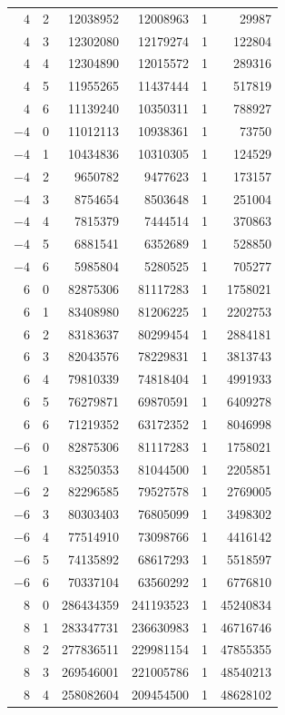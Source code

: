 {\begin{longtable}{rrrrrr}
$4$ & 2 & 12038952 & 12008963 & 1 & 29987\\
$4$ & 3 & 12302080 & 12179274 & 1 & 122804\\
$4$ & 4 & 12304890 & 12015572 & 1 & 289316\\
$4$ & 5 & 11955265 & 11437444 & 1 & 517819\\
$4$ & 6 & 11139240 & 10350311 & 1 & 788927\\
$-4$ & 0 & 11012113 & 10938361 & 1 & 73750\\
$-4$ & 1 & 10434836 & 10310305 & 1 & 124529\\
$-4$ & 2 & 9650782 & 9477623 & 1 & 173157\\
$-4$ & 3 & 8754654 & 8503648 & 1 & 251004\\
$-4$ & 4 & 7815379 & 7444514 & 1 & 370863\\
$-4$ & 5 & 6881541 & 6352689 & 1 & 528850\\
$-4$ & 6 & 5985804 & 5280525 & 1 & 705277\\
$6$ & 0 & 82875306 & 81117283 & 1 & 1758021\\
$6$ & 1 & 83408980 & 81206225 & 1 & 2202753\\
$6$ & 2 & 83183637 & 80299454 & 1 & 2884181\\
$6$ & 3 & 82043576 & 78229831 & 1 & 3813743\\
$6$ & 4 & 79810339 & 74818404 & 1 & 4991933\\
$6$ & 5 & 76279871 & 69870591 & 1 & 6409278\\
$6$ & 6 & 71219352 & 63172352 & 1 & 8046998\\
$-6$ & 0 & 82875306 & 81117283 & 1 & 1758021\\
$-6$ & 1 & 83250353 & 81044500 & 1 & 2205851\\
$-6$ & 2 & 82296585 & 79527578 & 1 & 2769005\\
$-6$ & 3 & 80303403 & 76805099 & 1 & 3498302\\
$-6$ & 4 & 77514910 & 73098766 & 1 & 4416142\\
$-6$ & 5 & 74135892 & 68617293 & 1 & 5518597\\
$-6$ & 6 & 70337104 & 63560292 & 1 & 6776810\\
$8$ & 0 & 286434359 & 241193523 & 1 & 45240834\\
$8$ & 1 & 283347731 & 236630983 & 1 & 46716746\\
$8$ & 2 & 277836511 & 229981154 & 1 & 47855355\\
$8$ & 3 & 269546001 & 221005786 & 1 & 48540213\\
$8$ & 4 & 258082604 & 209454500 & 1 & 48628102\\

\end{longtable}}

